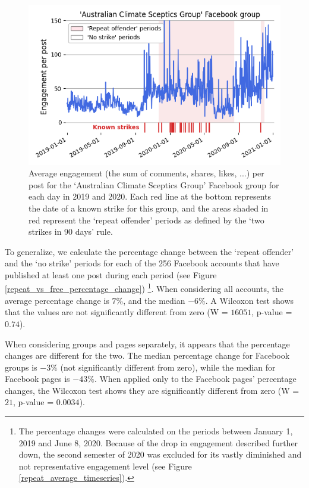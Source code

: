 \documentclass[11pt,a4paper]{article}
\begin{document}
\begin{figure}[!h]
\centering
\includegraphics[width=\linewidth]{./../figure/repeat_example_timeseries.png}
\caption{Average engagement (the sum of comments, shares, likes, ...) per post for the `Australian Climate Sceptics Group' Facebook group for each day in 2019 and 2020. Each red line at the bottom represents the date of a known strike for this group, and the areas shaded in red represent the `repeat offender' periods as defined by the ‘two strikes in 90 days’ rule.}
\label{repeat_example_timeseries}
\end{figure}

To generalize, we calculate the percentage change between the `repeat offender' and the `no strike' periods for each of the 256 Facebook accounts that have published at least one post during each period (see Figure \ref{repeat_vs_free_percentage_change})
\footnote{The percentage changes were calculated on the periods between January 1, 2019 and June 8, 2020. Because of the drop in engagement described further down, the second semester of 2020 was excluded for its vastly diminished and not representative engagement level (see Figure \ref{repeat_average_timeseries}).}.
When considering all accounts, the average percentage change is $7\%$, and the median $-6\%$. 
A Wilcoxon test shows that the values are not significantly different from zero (W = $16051$, p-value = $0.74$).

When considering groups and pages separately, it appears that the percentage changes are different for the two. 
The median percentage change for Facebook groups is $-3\%$ (not significantly different from zero), while the median for Facebook pages is $-43\%$. 
When applied only to the Facebook pages' percentage changes, the Wilcoxon test shows they are significantly different from zero (W = $21$, p-value = $0.0034$).
\end{document}
